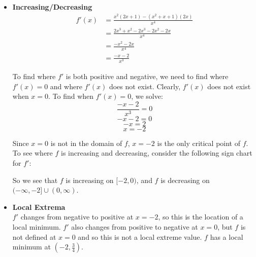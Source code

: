 \documentclass[handout, nooutcomes]{ximera}
\newcommand{\dfn}{\textbf}
\renewenvironment{freeResponse}{
\ifhandout\setbox0\vbox\bgroup\else
\begin{trivlist}\item[\hskip \labelsep\bfseries Solution:\hspace{2ex}]
\fi}
{\ifhandout\egroup\else
\end{trivlist}
\fi}
\begin{document}
\begin{problem}
\begin{freeResponse}
\begin{itemize}
			
			
			\item  \dfn{Increasing/Decreasing}  \\
			
			\begin{align*}
			f'(x) &= \frac{x^2(2x+1) - (x^2+x+1)(2x)}{x^4} \\
			&= \frac{2x^3 + x^2 - 2x^3 - 2x^2 - 2x}{x^4} \\
			&= \frac{-x^2 - 2x}{x^4} \\
			&= \frac{-x-2}{x^3}
			\end{align*}
			
			To find where $f'$ is both positive and negative, we need to find where $f'(x) = 0$ and where $f'(x)$ does not exist.  Clearly, $f'(x)$ does not exist when $x=0$.  To find when $f'(x) = 0$, we solve:
			$$ \frac{-x-2}{x^3} = 0 $$
			$$ -x-2 = 0 $$
			$$ -x = 2 $$
			$$ x = -2 $$
			
			Since $x=0$ is not in the domain of $f$, $x=-2$ is the only critical point of $f$.  To see where $f$ is increasing and decreasing, consider the following sign chart for $f'$:
			
		
\begin{center}
\begin{image}
\end{image}
\end{center}


So we see that $f$ is increasing on $[-2,0)$, and $f$ is decreasing on $(-\infty, -2] \cup (0,\infty)$.

			
			
			
			\item  \dfn{Local Extrema}  \\
			$f'$ changes from negative to positive at $x=-2$, so this is the location of a local minimum.  $f'$ also changes from positive to negative at $x=0$, but $f$ is not defined at $x=0$ and so this is not a local extreme value. $f$ has a local minimum at $\left( -2,\frac{3}{4} \right)$.
			

\end{itemize}
\end{freeResponse}
\end{problem}
\end{document}
